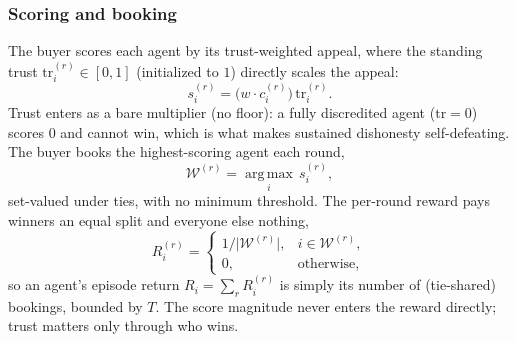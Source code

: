 \subsubsection{Scoring and booking}
The buyer scores each agent by its trust-weighted appeal, where the standing
trust $\mathrm{tr}_i^{(r)}\in[0,1]$ (initialized to $1$) directly scales the
appeal:
\begin{equation}
s_i^{(r)} = \bigl(w \cdot c_i^{(r)}\bigr)\,\mathrm{tr}_i^{(r)}.
\label{eq:dec-r-score}
\end{equation}
Trust enters as a bare multiplier (no floor): a fully discredited agent
($\mathrm{tr}=0$) scores $0$ and cannot win, which is what makes sustained
dishonesty self-defeating. The buyer books the highest-scoring agent each round,
\begin{equation}
\mathcal{W}^{(r)} = \operatorname*{arg\,max}_{i}\, s_i^{(r)},
\label{eq:dec-r-winner}
\end{equation}
set-valued under ties, with no minimum threshold. The per-round reward pays
winners an equal split and everyone else nothing,
\begin{equation}
R_i^{(r)} =
\begin{cases}
1/\lvert \mathcal{W}^{(r)} \rvert, & i \in \mathcal{W}^{(r)},\\[2pt]
0, & \text{otherwise,}
\end{cases}
\label{eq:dec-r-reward}
\end{equation}
so an agent's episode return $R_i=\sum_r R_i^{(r)}$ is simply its number of
(tie-shared) bookings, bounded by $T$. The score magnitude never enters the
reward directly; trust matters only through who wins.

